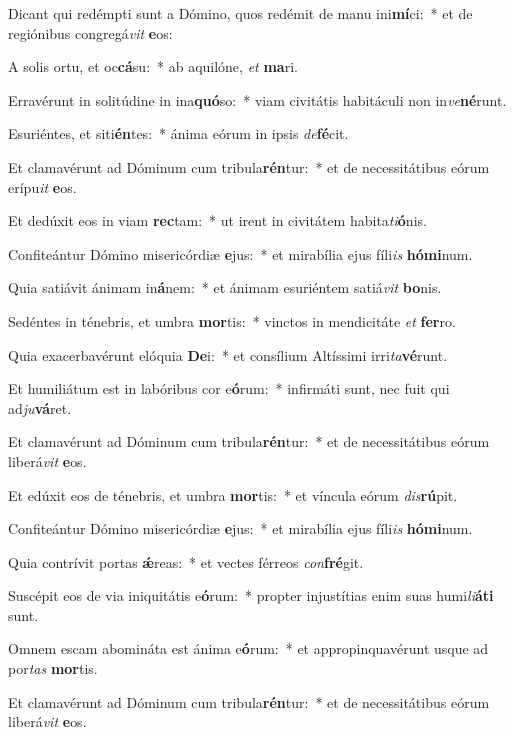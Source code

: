 \item Dicant qui redémpti sunt a Dómino, quos redémit de manu ini\textbf{mí}ci:~* et de regiónibus congregá\textit{vit} \textbf{e}os:
\item A solis ortu, et oc\textbf{cá}su:~* ab aquilóne, \textit{et} \textbf{ma}ri.
\item Erravérunt in solitúdine in ina\textbf{quó}so:~* viam civitátis habitáculi non in\textit{ve}\textbf{né}runt.
\item Esuriéntes, et siti\textbf{én}tes:~* ánima eórum in ipsis \textit{de}\textbf{fé}cit.
\item Et clamavérunt ad Dóminum cum tribula\textbf{rén}tur:~* et de necessitátibus eórum erípu\textit{it} \textbf{e}os.
\item Et dedúxit eos in viam \textbf{rec}tam:~* ut irent in civitátem habita\textit{ti}\textbf{ó}nis.
\item Confiteántur Dómino misericórdiæ \textbf{e}jus:~* et mirabília ejus fíli\textit{is} \textbf{hó}\textbf{mi}num.
\item Quia satiávit ánimam in\textbf{á}nem:~* et ánimam esuriéntem satiá\textit{vit} \textbf{bo}nis.
\item Sedéntes in ténebris, et umbra \textbf{mor}tis:~* vinctos in mendicitáte \textit{et} \textbf{fer}ro.
\item Quia exacerbavérunt elóquia \textbf{De}i:~* et consílium Altíssimi irri\textit{ta}\textbf{vé}runt.
\item Et humiliátum est in labóribus cor e\textbf{ó}rum:~* infirmáti sunt, nec fuit qui ad\textit{ju}\textbf{vá}ret.
\item Et clamavérunt ad Dóminum cum tribula\textbf{rén}tur:~* et de necessitátibus eórum liberá\textit{vit} \textbf{e}os.
\item Et edúxit eos de ténebris, et umbra \textbf{mor}tis:~* et víncula eórum \textit{dis}\textbf{rú}pit.
\item Confiteántur Dómino misericórdiæ \textbf{e}jus:~* et mirabília ejus fíli\textit{is} \textbf{hó}\textbf{mi}num.
\item Quia contrívit portas \textbf{ǽ}reas:~* et vectes férreos \textit{con}\textbf{fré}git.
\item Suscépit eos de via iniquitátis e\textbf{ó}rum:~* propter injustítias enim suas humi\textit{li}\textbf{á}\textbf{ti} sunt.
\item Omnem escam abomináta est ánima e\textbf{ó}rum:~* et appropinquavérunt usque ad por\textit{tas} \textbf{mor}tis.
\item Et clamavérunt ad Dóminum cum tribula\textbf{rén}tur:~* et de necessitátibus eórum liberá\textit{vit} \textbf{e}os.
